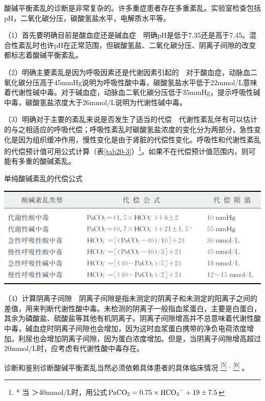 酸碱平衡紊乱的诊断是非常复杂的。许多重症患者存在多重紊乱。实验室检查包括pH，二氧化碳分压，碳酸氢盐水平，电解质水平等。

（1）首先要明确目前是酸血症还是碱血症　明确pH是低于7.35还是高于7.45。混合性紊乱时也许pH在正常范围，但碳酸氢盐、二氧化碳分压、阴离子间隙的改变都标志着酸碱平衡紊乱。

（2）明确主要紊乱是因为呼吸因素还是代谢因素引起的　对于酸血症，动脉血二氧化碳分压高于45mmHg说明为呼吸性酸中毒，碳酸氢盐水平低于22mmol/L意味着代谢性碱中毒。对于碱血症，动脉血二氧化碳分压低于35mmHg，提示呼吸性碱中毒，碳酸氢盐浓度大于26mmol/L说明为代谢性碱中毒。

（3）明确对于主要的紊乱来说是否发生了适当的代偿　代谢性紊乱伴有可以估计的与之相适应的呼吸代偿；呼吸性紊乱时碳酸氢盐浓度的变化分为两部分，急性变化是因为组织缓冲作用，慢性变化是由于肾脏的代偿性变化。呼吸性和代谢性紊乱的代偿预计值可用公式计算（表\ref{tab20-3}）\footnote{* 当
＞40mmol/L时，用公式$\text{PaCO}_2=0.75\times \ce{HCO3-}+19\pm 7.5$}。如果不在代偿预计值范围内，则可能有多重的酸碱紊乱。

\begin{table}[htbp]
\centering
\caption{单纯酸碱紊乱的代偿公式}
\label{tab20-3}
\includegraphics{./images/Image00220.jpg}
\end{table}



（4）计算阴离子间隙　阴离子间隙是指未测定的阴离子和未测定的阳离子之间的差值，用来判断代谢性酸中毒。未检测的阴离子一般指血浆蛋白，主要是白蛋白，其余为磷酸盐、硫酸盐等其他有机阴离子。阴离子间隙增高并不总意味着代谢性酸中毒，碱血症时阴离子间隙也会增加，因为这时血浆蛋白携带的净负电荷浓度增加。利尿也会增加阴离子间隙，因为蛋白浓度增加。但是，当阴离子间隙增高超过20mmol/L时，应考虑有代谢性酸中毒存在。

诊断和鉴别诊断酸碱平衡紊乱当然必须依赖具体患者的具体临床情况
\protect\hyperlink{text00026.htmlux5cux23ch5-25}{\textsuperscript{{[}5{]}}}
\textsuperscript{,}
\protect\hyperlink{text00026.htmlux5cux23ch6-25}{\textsuperscript{{[}6{]}}}
。

